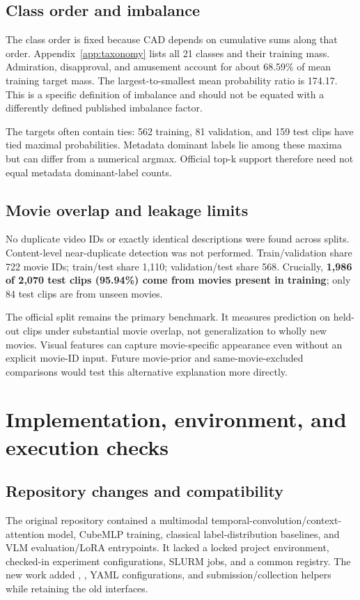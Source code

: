 \documentclass[11pt,a4paper]{article}
\begin{document}
\subsection{Class order and imbalance}
The class order is fixed because CAD depends on cumulative sums along that order. Appendix~\ref{app:taxonomy} lists all 21 classes and their training mass. Admiration, disapproval, and amusement account for about 68.59\% of mean training target mass. The largest-to-smallest mean probability ratio is 174.17. This is a specific definition of imbalance and should not be equated with a differently defined published imbalance factor.

The targets often contain ties: 562 training, 81 validation, and 159 test clips have tied maximal probabilities. Metadata dominant labels lie among these maxima but can differ from a numerical argmax. Official top-k support therefore need not equal metadata dominant-label counts.

\subsection{Movie overlap and leakage limits}
No duplicate video IDs or exactly identical descriptions were found across splits. Content-level near-duplicate detection was not performed. Train/validation share 722 movie IDs; train/test share 1,110; validation/test share 568. Crucially, \textbf{1,986 of 2,070 test clips (95.94\%) come from movies present in training}; only 84 test clips are from unseen movies.

The official split remains the primary benchmark. It measures prediction on held-out clips under substantial movie overlap, not generalization to wholly new movies. Visual features can capture movie-specific appearance even without an explicit movie-ID input. Future movie-prior and same-movie-excluded comparisons would test this alternative explanation more directly.

\section{Implementation, environment, and execution checks}
\subsection{Repository changes and compatibility}
The original repository contained a multimodal temporal-convolution/context-attention model, CubeMLP training, classical label-distribution baselines, and VLM evaluation/LoRA entrypoints. It lacked a locked project environment, checked-in experiment configurations, SLURM jobs, and a common registry. The new work added , , YAML configurations, and submission/collection helpers while retaining the old interfaces.
\end{document}
